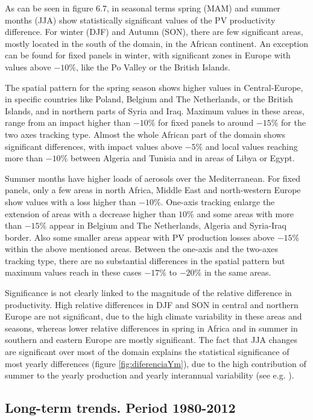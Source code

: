 As can be seen in figure 6.7, in seasonal terms spring (MAM) and summer months (JJA) show statistically significant values of the PV productivity difference. For winter (DJF) and Autumn (SON), there are few significant areas, mostly located in the south of the domain, in the African continent. An exception can be found for fixed panels in winter, with significant zones in Europe with values above $-10\%$, like the Po Valley or the British Islands. 

The spatial pattern for the spring season shows higher values in Central-Europe, in specific countries like Poland, Belgium and The Netherlands, or the British Islands, and in northern parts of Syria and Iraq. Maximum values in these areas, range from an impact higher than $-10\%$ for fixed panels to around $-15\%$ for the two axes tracking type. Almost the whole African part of the domain shows significant differences, with impact values above $-5\%$ and local values reaching more than $-10\%$ between Algeria and Tunisia and in areas of Libya or Egypt. 

Summer months have higher loads of aerosols over the Mediterranean. For fixed panels, only a few areas in north Africa, Middle East and north-western Europe show values with a loss higher than $-10\%$. One-axis tracking enlarge the extension of areas with a decrease higher than $10\%$ and some areas with more than $-15\%$ appear in Belgium and The Netherlands, Algeria and Syria-Iraq border. Also some smaller areas appear with PV production losses above $-15\%$ within the above mentioned areas. Between the one-axis and the two-axes tracking type, there are no substantial differences in the spatial pattern but maximum values reach in these cases $-17\%$ to $-20\%$ in the same areas.

Significance is not clearly linked to the magnitude of the relative difference in productivity. High relative differences in DJF and SON in central and northern Europe are not significant, due to the high climate variability in these areas and seasons, whereas lower relative differences in spring in Africa and in summer in southern and eastern Europe are mostly significant. The fact that JJA changes are significant over most of the domain explains the statistical significance of most yearly differences (figure \ref{fig:diferenciaYm}), due to the high contribution of summer to the yearly production and yearly interannual variability (see e.g. \cite{Gil2015}).


\subsection{Long-term trends. Period 1980-2012}

